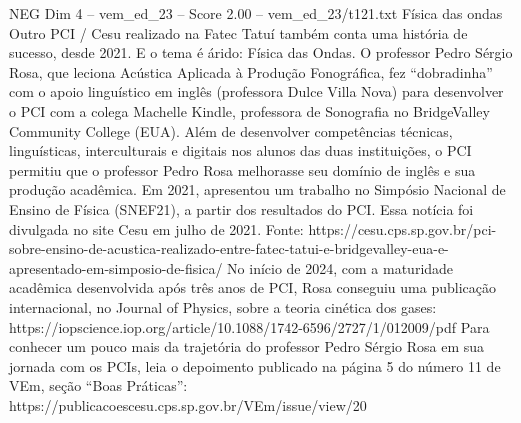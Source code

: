 \begin{textsample}{NEG Dim 4 – vem\_ed\_23 – Score 2.00 – vem\_ed\_23/t121.txt}  \label{ex:f4_neg_089}
Física das ondas Outro PCI / Cesu realizado na Fatec Tatuí também conta uma história de sucesso, desde 2021.
E o tema é árido: Física das Ondas.
O professor Pedro Sérgio Rosa, que leciona Acústica Aplicada à Produção Fonográfica, fez “dobradinha” com o apoio linguístico em inglês (professora Dulce Villa Nova) para desenvolver o PCI com a colega Machelle Kindle, professora de Sonografia no BridgeValley Community College (EUA).
Além de desenvolver competências técnicas, linguísticas, interculturais e digitais nos alunos das duas instituições, o PCI permitiu que o professor Pedro Rosa melhorasse seu domínio de inglês e sua produção acadêmica.
Em 2021, apresentou um trabalho no Simpósio Nacional de Ensino de Física (SNEF21), a partir dos resultados do PCI.
Essa notícia foi divulgada no site Cesu em julho de 2021.
Fonte: https://cesu.cps.sp.gov.br/pci-sobre-ensino-de-acustica-realizado-entre-fatec-tatui-e-bridgevalley-eua-e-apresentado-em-simposio-de-fisica/ No início de 2024, com a maturidade acadêmica desenvolvida após três anos de PCI, Rosa conseguiu uma publicação internacional, no Journal of Physics, sobre a teoria cinética dos gases: https://iopscience.iop.org/article/10.1088/1742-6596/2727/1/012009/pdf Para conhecer um pouco mais da trajetória do professor Pedro Sérgio Rosa em sua jornada com os PCIs, leia o depoimento publicado na página 5 do número 11 de VEm, seção “Boas Práticas”: https://publicacoescesu.cps.sp.gov.br/VEm/issue/view/20

\end{textsample}
